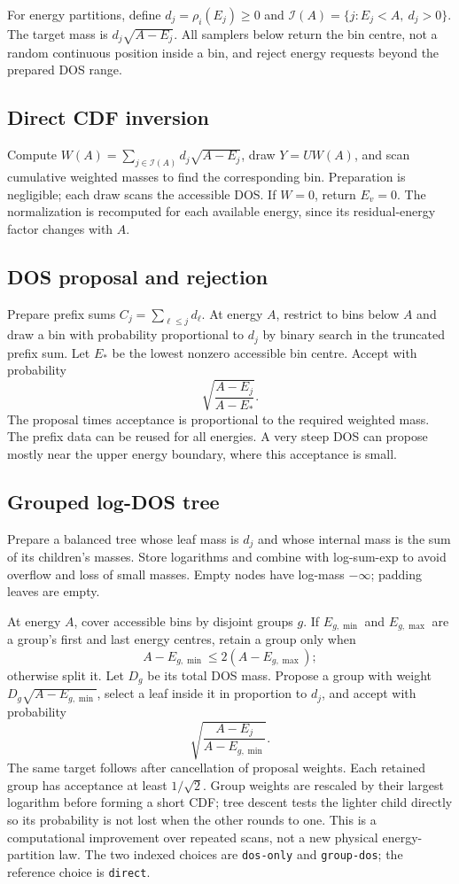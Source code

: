 \documentclass[10pt,a4paper]{article}
\begin{document}
For energy partitions, define $d_j=\rho_i(E_j)\geq0$ and
$\mathcal I(A)=\{j:E_j<A,\ d_j>0\}$. The target mass is
$d_j\sqrt{A-E_j}$. All samplers below return the bin centre, not a random
continuous position inside a bin, and reject energy requests beyond the
prepared DOS range.

\subsection{Direct CDF inversion}
Compute $W(A)=\sum_{j\in\mathcal I(A)}d_j\sqrt{A-E_j}$, draw
$Y=UW(A)$, and scan cumulative weighted masses to find the corresponding bin.
Preparation is negligible; each draw scans the accessible DOS. If $W=0$,
return $E_v=0$. The normalization is recomputed for each available energy,
since its residual-energy factor changes with $A$.

\subsection{DOS proposal and rejection}
Prepare prefix sums $C_j=\sum_{\ell\leq j}d_\ell$. At energy $A$, restrict to
bins below $A$ and draw a bin with probability proportional to $d_j$ by binary
search in the truncated prefix sum. Let $E_*$ be the lowest nonzero accessible
bin centre. Accept with probability
\[
 \sqrt{\frac{A-E_j}{A-E_*}}.
\]
The proposal times acceptance is proportional to the required weighted mass.
The prefix data can be reused for all energies. A very steep DOS can propose
mostly near the upper energy boundary, where this acceptance is small.

\subsection{Grouped log-DOS tree}
Prepare a balanced tree whose leaf mass is $d_j$ and whose internal mass is
the sum of its children's masses. Store logarithms and combine with
log-sum-exp to avoid overflow and loss of small masses. Empty nodes have
log-mass $-\infty$; padding leaves are empty.

At energy $A$, cover accessible bins by disjoint groups $g$. If $E_{g,\min}$
and $E_{g,\max}$ are a group's first and last energy centres, retain a group
only when
\[
 A-E_{g,\min}\leq2(A-E_{g,\max});
\]
otherwise split it. Let $D_g$ be its total DOS mass. Propose a group with
weight $D_g\sqrt{A-E_{g,\min}}$, select a leaf inside it in proportion to
$d_j$, and accept with probability
\[
 \sqrt{\frac{A-E_j}{A-E_{g,\min}}}.
\]
The same target follows after cancellation of proposal weights. Each retained
group has acceptance at least $1/\sqrt2$. Group weights are rescaled by their
largest logarithm before forming a short CDF; tree descent tests the lighter
child directly so its probability is not lost when the other rounds to one.
This is a computational improvement over repeated scans, not a new physical
energy-partition law. The two indexed choices are \texttt{dos-only} and
\texttt{group-dos}; the reference choice is \texttt{direct}.
\end{document}
